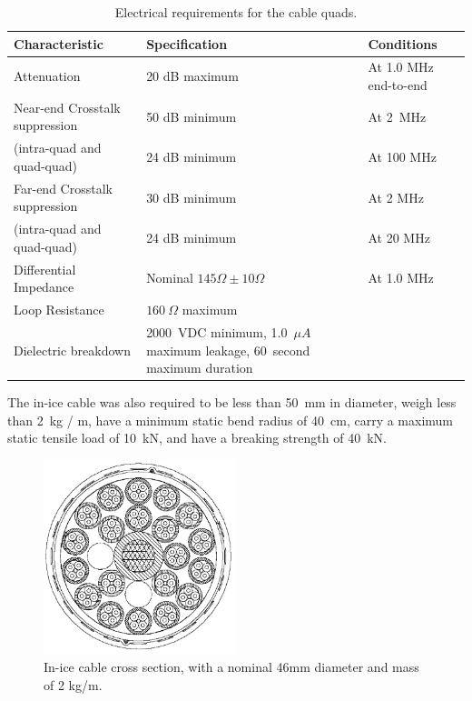 \begin{table}[h]
  \centering
  \caption{Electrical requirements for the cable quads.} 
  \begin{tabularx}{\textwidth}{ l X  X  }
    \toprule
    Characteristic& Specification & Conditions \\
    \midrule

    Attenuation & 20 dB maximum & At 1.0 MHz end-to-end \\
%

   Near-end Crosstalk suppression& 50 dB minimum & At 2~MHz \\
(intra-quad and quad-quad)&24 dB minimum& At 100 MHz\\
   Far-end Crosstalk suppression& 30 dB minimum & At 2 MHz \\
(intra-quad and quad-quad)&24 dB minimum& At 20 MHz\\


    Differential Impedance & Nominal $145\Omega \pm 10\Omega$ & At 1.0 MHz \\

    Loop Resistance & $160~\Omega$ maximum & \\

    Dielectric breakdown & 2000~VDC minimum, 1.0~$\mu A$ maximum leakage, 60~second
    maximum duration & \\
    \bottomrule  
  \end{tabularx}
  \label{tab:quad_requirements}
\end{table}

 The in-ice cable was also required to be less than 50~mm in
 diameter, weigh less than 2~kg / m, have a minimum static bend radius of 40~cm,
 carry a maximum static tensile load of 10~kN, and have a breaking strength
 of 40~kN.
 
\begin{figure}
  \centering
  \includegraphics[width=0.5\textwidth]{graphics/cables/cable_xsection.png}
  \caption{\label{fig:cable_xsection}In-ice cable cross
    section, with a nominal 46mm diameter and mass of 2 kg/m.} 
\end{figure}

